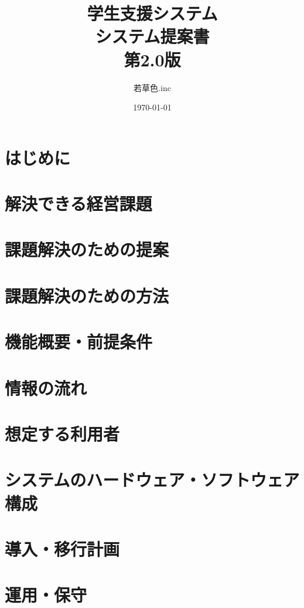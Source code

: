 \documentclass[a4j]{jarticle}
\title{
\vspace{30mm}
{\small 学生支援システム} 
\\
\vspace{5mm}
{\bf システム提案書\\}
\vspace{5mm}
{\small 第2.0版}
\vspace{90mm}
}
\date{\today}
\author{
\vspace{5mm}
  若草色.inc
\vspace{10mm}
}
\begin{document}
\maketitle

\newpage


\section{はじめに}



\section{解決できる経営課題}


\section{課題解決のための提案}


\section{課題解決のための方法}


\section{機能概要・前提条件}


\section{情報の流れ}


\section{想定する利用者}


\section{システムのハードウェア・ソフトウェア構成}


\section{導入・移行計画}


\section{運用・保守}

\end{document}
